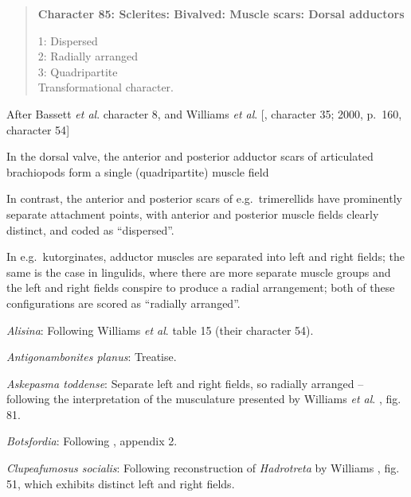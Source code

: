 \documentclass[openany]{book}
\begin{document}
\begin{quote}
\textbf{Character 85: Sclerites: Bivalved: Muscle scars: Dorsal
adductors}

1: Dispersed\\
2: Radially arranged\\
3: Quadripartite\\
Transformational character.
\end{quote}

After Bassett \emph{et al}.
\citeyearpar{Bassett2001Functionalmorphology} character 8, and Williams
\emph{et al}. {[}\citet{Williams1996Asupra}, character 35; 2000, p.~160,
character 54{]}

In the dorsal valve, the anterior and posterior adductor scars of
articulated brachiopods form a single (quadripartite) muscle field
\citep[p.~201]{Williams2000LinguliformeaCraniiformea}

In contrast, the anterior and posterior scars of e.g.~trimerellids have
prominently separate attachment points, with anterior and posterior
muscle fields clearly distinct, and coded as ``dispersed''.

In e.g.~kutorginates, adductor muscles are separated into left and right
fields; the same is the case in lingulids, where there are more separate
muscle groups and the left and right fields conspire to produce a radial
arrangement; both of these configurations are scored as ``radially
arranged''.

\hypertarget{Alisina-coding-85}{}
\emph{Alisina}: Following Williams \emph{et al}.
\citeyearpar{Williams2000LinguliformeaCraniiformea} table 15 (their
character 54).

\hypertarget{Antigonambonites_planus-coding-85}{}
\emph{Antigonambonites planus}: Treatise.

\hypertarget{Askepasma_toddense-coding-85}{}
\emph{Askepasma toddense}: Separate left and right fields, so radially
arranged -- following the interpretation of the musculature presented by
Williams \emph{et al}.
\citeyearpar{Williams2000LinguliformeaCraniiformea}, fig. 81.

\hypertarget{Botsfordia-coding-85}{}
\emph{Botsfordia}: Following \citet{Williams1998Thediversity}, appendix
2.

\hypertarget{Clupeafumosus_socialis-coding-85}{}
\emph{Clupeafumosus socialis}: Following reconstruction of
\emph{Hadrotreta} by Williams
\citeyearpar{Williams2000LinguliformeaCraniiformea}, fig. 51, which
exhibits distinct left and right fields.
\end{document}
